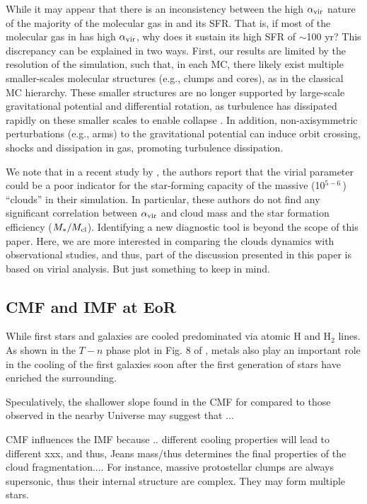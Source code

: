 \documentclass[iop]{emulateapj}
\begin{document}
While it may appear that there is an inconsistency between the high $\alpha_{\rm vir}$
nature of the majority of the molecular gas in \flower and its SFR.
That is, if most of the molecular gas in \flower has high $\alpha_{\rm vir}$, why does it sustain its high SFR of $\sim$100\,\Msun\,yr\pmOne?
This discrepancy can be explained in two ways.
First, our results are limited by the resolution of the simulation, such that, in each MC, there
likely exist multiple smaller-scales molecular structures (e.g., clumps and cores),
as in the classical MC hierarchy. These smaller structures are 
no longer supported by large-scale gravitational potential and differential rotation,
as turbulence has dissipated rapidly on these smaller scales to enable collapse \citep{Clark04a}.
In addition, non-axisymmetric perturbations (e.g., arms) to the gravitational potential
can induce orbit crossing, shocks and dissipation in gas, promoting turbulence dissipation.

We note that in a recent study by \citet{Pettitt18a}, the authors report that the virial parameter could be a poor indicator
for the star-forming capacity of the massive (10$^{5-6}$\,\Msun) ``clouds'' in their simulation. 
In particular, these authors do not find any significant correlation between $\alpha_{\rm vir}$ and cloud mass
and the star formation efficiency ($M_*/M_{\rm cl}$).
Identifying a new diagnostic tool 
is beyond the scope of this paper. Here, we are more interested in 
comparing the clouds dynamics with observational studies, and thus, 
part of the discussion presented in this paper is based on virial analysis.
But just something to keep in mind.

\subsection{CMF and IMF at EoR}

While first stars and galaxies are cooled predominated via atomic H and H$_2$ lines.
As shown in the $T-n$ phase plot in Fig. 8 of \citealt{Pallottini17b}, 
metals also play an important role in the cooling of the first galaxies soon after the first generation of stars have enriched the surrounding.

Speculatively, the shallower slope found in the CMF for \flower compared to those observed in the nearby Universe may
suggest that ...

CMF influences the IMF because .. different cooling properties will lead to different xxx, and thus, Jeans mass/thus determines the final properties of the cloud fragmentation....  For instance, massive protostellar clumps are always supersonic, thus their internal structure are complex. They may form multiple stars.
\end{document}
